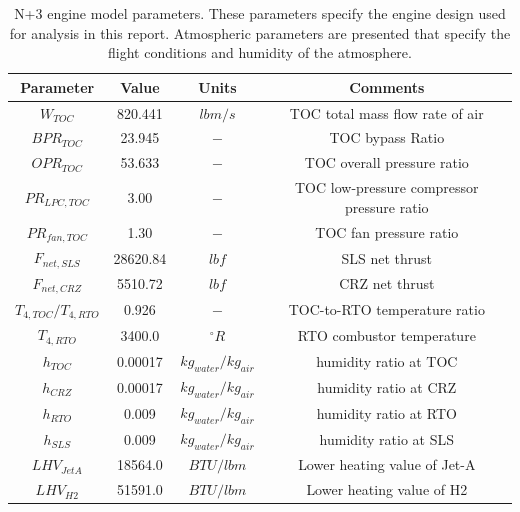 \documentclass[conf]{new-aiaa}
\begin{document}
\begin{table}[hbt!]
  \centering
  \caption{
    N+3 engine model parameters.
    These parameters specify the engine design used for analysis in this report.
    Atmospheric parameters are presented that specify the flight conditions and humidity of the atmosphere.}
  \begin{tabular}{c c c c}
    \hline
    Parameter             & Value    & Units                 & Comments                                        \\
    \hline
    $W_{TOC}$             & 820.441  & $lbm/s$               & TOC total mass flow rate of air                 \\
    $BPR_{TOC}$           & 23.945   & $-$                   & TOC bypass Ratio                                \\
    $OPR_{TOC}$           & 53.633   & $-$                   & TOC overall pressure ratio                      \\
    $PR_{LPC,TOC}$        & 3.00     & $-$                   & TOC low-pressure compressor pressure ratio      \\
    $PR_{fan,TOC}$        & 1.30     & $-$                   & TOC fan pressure ratio                          \\
    $F_{net,SLS}$         & 28620.84 & $lbf$                 & SLS net thrust                                  \\
    $F_{net,CRZ}$         & 5510.72  & $lbf$                 & CRZ net thrust                                  \\
    $T_{4,TOC}/T_{4,RTO}$ & 0.926    & $-$                   & TOC-to-RTO temperature ratio                    \\
    $T_{4,RTO}$           & 3400.0   & $^{\circ}R$           & RTO combustor temperature                       \\
    $h_{TOC}$             & 0.00017  & $kg_{water}/kg_{air}$ & humidity ratio at TOC \cite{Kalnay1996}         \\
    $h_{CRZ}$             & 0.00017  & $kg_{water}/kg_{air}$ & humidity ratio at CRZ \cite{Kalnay1996}         \\
    $h_{RTO}$             & 0.009    & $kg_{water}/kg_{air}$ & humidity ratio at RTO \cite{Kalnay1996}         \\
    $h_{SLS}$             & 0.009    & $kg_{water}/kg_{air}$ & humidity ratio at SLS \cite{Kalnay1996}         \\
    $LHV_{JetA}$          & 18564.0  & $BTU/lbm$             & Lower heating value of Jet-A \cite{Lawicki2002} \\
    $LHV_{H2}$            & 51591.0  & $BTU/lbm$             & Lower heating value of H2 \cite{toolbox2003}    \\
    \hline
  \end{tabular}
  \label{engine_params}
\end{table}
\end{document}
